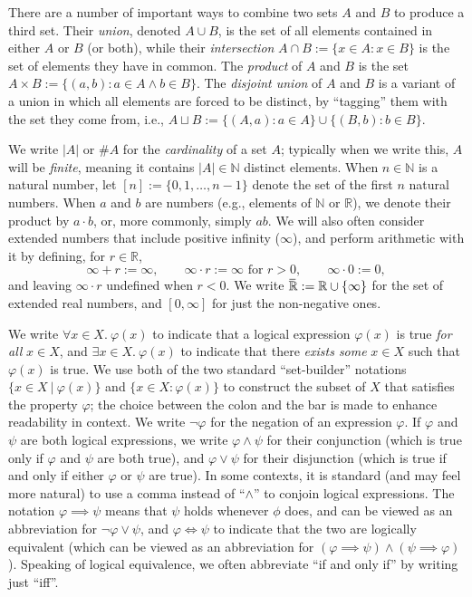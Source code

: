 There are a number of important ways to combine two sets $A$ and $B$ to produce a third set.  
Their \emph{union}, denoted $A \cup B$, is the set of all elements contained in either $A$ or $B$ (or both),
while their \emph{intersection} $A \cap B := \{x \in A : x \in B\}$ is the set of elements they have in common.
The \emph{product} of $A$ and $B$ is the set $A \times B := \{ (a,b) : a \in A \land b \in B\}$. 
The \emph{disjoint union} of $A$ and $B$ is a variant of a union in which all elements are forced to be distinct, by ``tagging'' them with the set they come from, i.e., 
$
    A \sqcup B := \{ (A, a) : a \in A \} \cup \{ (B, b) : b \in B \}. 
$

We write $|A|$ or $\# A$ for the \emph{cardinality} of a set $A$;
    typically when we write this,  $A$ will be \emph{finite}, 
    meaning it contains $|A| \in \mathbb N$ distinct elements. 
When $n \in \mathbb N$ is a natural number, let
    $[n] := \{ 0, 1, \ldots, n-1 \}$ denote the set of the first $n$ natural numbers.
When $a$ and $b$ are numbers (e.g., elements of $\mathbb N$ or $\mathbb R$), we denote their product by $a \cdot b$, or, more commonly, simply $a b$.
We will also often consider extended numbers that include positive infinity ($\infty$), and perform arithmetic with it by defining, for $r \in \mathbb R$,
\[
    \infty + r := \infty,
    \qquad 
    \infty \cdot r := \infty \text{ for }r > 0,
    \qquad
    \infty \cdot 0 := 0,
\]
and leaving $\infty \cdot r$ undefined when $r < 0$. 
We write $\mskip1mu\overline{\mskip-1mu\mathbb R\!}\, := \mathbb R \cup \{\infty\}$ for the set of extended real numbers, and $[0, \infty]$ for just the non-negative ones. 


We write $\forall x \in X.~\varphi(x)$ to indicate that a logical expression $\varphi(x)$ is true \emph{for all} $x \in X$, and $\exists x \in X.~ \varphi(x)$ to indicate that there \emph{exists some} $x \in X$ such that $\varphi(x)$ is true.
We use both of the two standard ``set-builder'' notations 
$\{ x \in X ~|~ \varphi(x) \}$ 
    and
    $\{ x \in X : \varphi(x) \}$ 
    to construct the subset of $X$ that satisfies the property $\varphi$;
    the choice between the colon and the bar is made to enhance readability in context.
We write $\lnot\varphi$ for the negation of an expression $\varphi$. 
If $\varphi$ and $\psi$ are both logical expressions, we write $\varphi \land \psi$ for their conjunction (which is true only if $\varphi$ and $\psi$ are both true), and $\varphi \lor \psi$ for their disjunction (which is true if and only if either $\varphi$ or $\psi$ are true).
In some contexts, it is standard (and may feel more natural) to use a comma instead of ``$\land$'' to conjoin logical expressions. 
The notation $\varphi \implies \psi$ means that $\psi$ holds whenever $\phi$ does, and can be viewed as an abbreviation for $\lnot \varphi \lor \psi$, 
and $\varphi \iff \psi$ to indicate that the two are logically equivalent (which can be viewed as an abbreviation for $(\varphi \implies \psi) \land (\psi \implies \varphi)$).
Speaking of logical equivalence, we often abbreviate ``if and only if'' by writing just ``iff''. 

